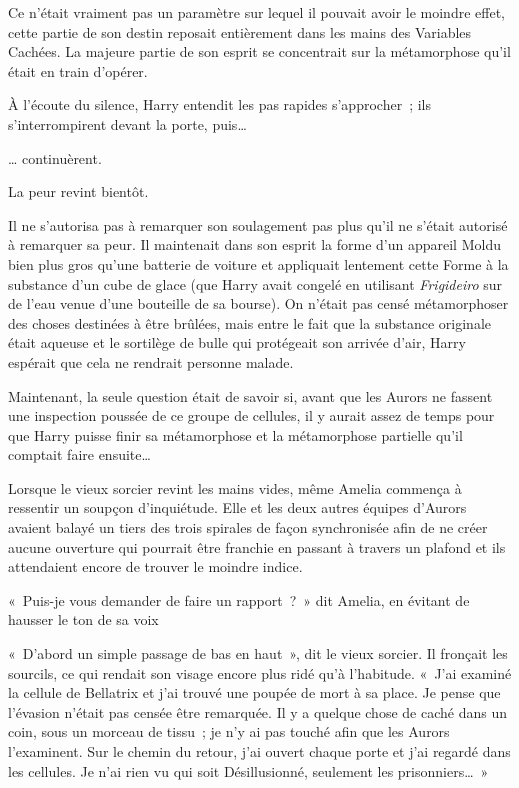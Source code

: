 Ce n'était vraiment pas un paramètre sur lequel il pouvait avoir le moindre effet, cette partie de son destin reposait entièrement dans les mains des Variables Cachées.
La majeure partie de son esprit se concentrait sur la métamorphose qu'il était en train d'opérer.

À l'écoute du silence, Harry entendit les pas rapides s'approcher~; ils s'interrompirent devant la porte, puis…

… continuèrent.

La peur revint bientôt.

Il ne s'autorisa pas à remarquer son soulagement pas plus qu'il ne s'était autorisé à remarquer sa peur.
Il maintenait dans son esprit la forme d'un appareil Moldu bien plus gros qu'une batterie de voiture et appliquait lentement cette Forme à la substance d'un cube de glace (que Harry avait congelé en utilisant \emph{Frigideiro} sur de l'eau venue d'une bouteille de sa bourse).
On n'était pas censé métamorphoser des choses destinées à être brûlées, mais entre le fait que la substance originale était aqueuse et le sortilège de bulle qui protégeait son arrivée d'air, Harry espérait que cela ne rendrait personne malade.

Maintenant, la seule question était de savoir si, avant que les Aurors ne fassent une inspection poussée de ce groupe de cellules, il y aurait assez de temps pour que Harry puisse finir sa métamorphose et la métamorphose partielle qu'il comptait faire ensuite…

\later

Lorsque le vieux sorcier revint les mains vides, même Amelia commença à ressentir un soupçon d'inquiétude.
Elle et les deux autres équipes d'Aurors avaient balayé un tiers des trois spirales de façon synchronisée afin de ne créer aucune ouverture qui pourrait être franchie en passant à travers un plafond et ils attendaient encore de trouver le moindre indice.

«~Puis-je vous demander de faire un rapport~?~»
dit Amelia, en évitant de hausser le ton de sa voix

«~D'abord un simple passage de bas en haut~», dit le vieux sorcier.
Il fronçait les sourcils, ce qui rendait son visage encore plus ridé qu'à l'habitude.
«~J'ai examiné la cellule de Bellatrix et j'ai trouvé une poupée de mort à sa place.
Je pense que l'évasion n'était pas censée être remarquée.
Il y a quelque chose de caché dans un coin, sous un morceau de tissu~; je n'y ai pas touché afin que les Aurors l'examinent.
Sur le chemin du retour, j'ai ouvert chaque porte et j'ai regardé dans les cellules.
Je n'ai rien vu qui soit Désillusionné, seulement les prisonniers…~»


